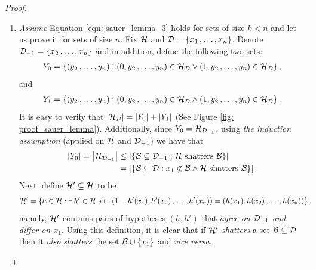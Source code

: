 \documentclass[11pt]{article}
\begin{document}
\begin{itemize}
\begin{proof}
\begin{enumerate}
\item  \emph{Assume} Equation \eqref{eqn: sauer_lemma_3} holds for sets of size $k < n$ and let us prove it for sets of size $n$. 
Fix ${\mathcal H}$ and ${\mathcal D} = \left\{x_1 \,{,}\ldots{,}\, x_n\right\}$. Denote ${\mathcal D}_{-1} = \left\{x_2 \,{,}\ldots{,}\, x_n\right\}$ and in addition, define the
following two sets:
\begin{align*}
Y_{0} = \left\{(y_2 \,{,}\ldots{,}\, y_n): (0, y_2 \,{,}\ldots{,}\, y_n) \in {\mathcal H}_{{\mathcal D}} \lor  (1, y_2 \,{,}\ldots{,}\, y_n) \in {\mathcal H}_{{\mathcal D}}\right\},
\end{align*}
and
\begin{align*}
Y_{1} = \left\{(y_2 \,{,}\ldots{,}\, y_n): (0, y_2 \,{,}\ldots{,}\, y_n) \in {\mathcal H}_{{\mathcal D}} \land  (1, y_2 \,{,}\ldots{,}\, y_n) \in {\mathcal H}_{{\mathcal D}}\right\}.
\end{align*}
It is easy to verify that $\left\lvert {\mathcal H}_{{\mathcal D}} \right\rvert = \left\lvert Y_0 \right\rvert + \left\lvert Y_1 \right\rvert$ (See Figure \ref{fig: proof_sauer_lemma}). Additionally, since $Y_0 = {\mathcal H}_{{\mathcal D}_{-1}}$, using \emph{the induction assumption} (applied on ${\mathcal H}$ and ${\mathcal D}_{-1}$) we have that
\begin{align*}
\left\lvert Y_0 \right\rvert = \left\lvert {\mathcal H}_{{\mathcal D}_{-1}} \right\rvert &\le \left\lvert \left\{{\mathcal B} \subseteq {\mathcal D}_{-1}: {\mathcal H}\text{ shatters }{\mathcal B}\right\} \right\rvert \\
&=  \left\lvert \left\{{\mathcal B} \subseteq {\mathcal D}: x_1 \not\in {\mathcal B} \land {\mathcal H}\text{ shatters }{\mathcal B}\right\} \right\rvert.
\end{align*}
Next, define ${\mathcal H}' \subseteq {\mathcal H}$ to be
\begin{align*}
{\mathcal H}'  &= \left\{h \in {\mathcal H} : \exists\,h' \in {\mathcal H}\text{ s.t. }(1 - h'(x_1), h'(x_2) \,{,}\ldots{,}\, h'(x_n)) = (h(x_1), h(x_2)  \,{,}\ldots{,}\, h(x_n)) \right\},
\end{align*}
namely, ${\mathcal H}'$ contains pairs of hypotheses $(h, h')$ that \emph{agree on ${\mathcal D}_{-1}$ and differ on $x_1$}. Using this definition, it is clear that if ${\mathcal H}'$ \emph{shatters} a set ${\mathcal B} \subseteq {\mathcal D}$ then it \emph{also shatters} the set ${\mathcal B} \cup \left\{x_1\right\}$ and \emph{vice versa}. 


\end{enumerate}
\end{proof}
\end{itemize}
\end{document}
